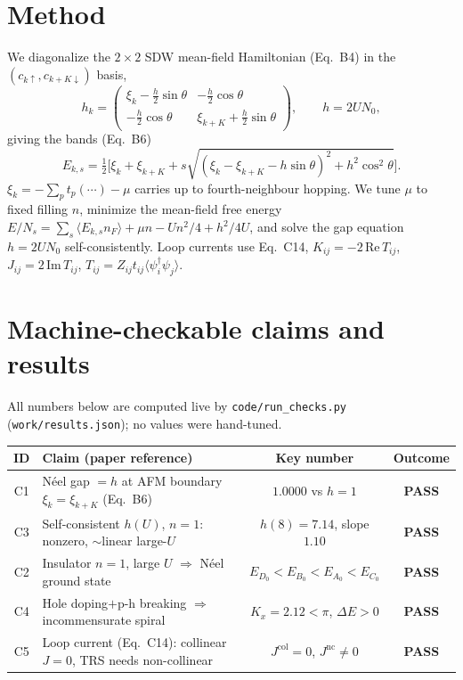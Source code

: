 \documentclass[11pt]{article}
\begin{document}
\section{Method}
We diagonalize the $2\times2$ SDW mean-field Hamiltonian (Eq.~B4) in the
$(c_{k\uparrow},c_{k+K\downarrow})$ basis,
\[
h_k=\begin{pmatrix}\xi_k-\tfrac{h}{2}\sin\theta & -\tfrac{h}{2}\cos\theta\\[2pt]
-\tfrac{h}{2}\cos\theta & \xi_{k+K}+\tfrac{h}{2}\sin\theta\end{pmatrix},
\qquad h=2UN_0,
\]
giving the bands (Eq.~B6)
\[
E_{k,s}=\tfrac12\Big[\xi_k+\xi_{k+K}+s\sqrt{(\xi_k-\xi_{k+K}-h\sin\theta)^2
+h^2\cos^2\theta}\Big].
\]
$\xi_k=-\sum_p t_p(\cdots)-\mu$ carries up to fourth-neighbour hopping. We tune
$\mu$ to fixed filling $n$, minimize the mean-field free energy
$E/N_s=\sum_s\langle E_{k,s}n_F\rangle+\mu n-Un^2/4+h^2/4U$, and solve the gap
equation $h=2UN_0$ self-consistently. Loop currents use Eq.~C14,
$K_{ij}=-2\,\mathrm{Re}\,T_{ij}$, $J_{ij}=2\,\mathrm{Im}\,T_{ij}$,
$T_{ij}=Z_{ij}t_{ij}\langle\psi_i^\dagger\psi_j\rangle$.

\section{Machine-checkable claims and results}
All numbers below are computed live by \texttt{code/run\_checks.py}
(\texttt{work/results.json}); no values were hand-tuned.

\begin{center}\small
\begin{tabular}{clcc}
\toprule
ID & Claim (paper reference) & Key number & Outcome\\
\midrule
C1 & N\'eel gap $=h$ at AFM boundary $\xi_k{=}\xi_{k+K}$ (Eq.~B6) & $1.0000$ vs $h{=}1$ & \textbf{PASS}\\
C3 & Self-consistent $h(U)$, $n{=}1$: nonzero, $\sim$linear large-$U$ & $h(8){=}7.14$, slope $1.10$ & \textbf{PASS}\\
C2 & Insulator $n{=}1$, large $U$ $\Rightarrow$ N\'eel ground state & $E_{D_0}{<}E_{B_0}{<}E_{A_0}{<}E_{C_0}$ & \textbf{PASS}\\
C4 & Hole doping$+$p-h breaking $\Rightarrow$ incommensurate spiral & $K_x{=}2.12{<}\pi$, $\Delta E{>}0$ & \textbf{PASS}\\
C5 & Loop current (Eq.~C14): collinear $J{=}0$, TRS needs non-collinear & $J^{\text{col}}{=}0$, $J^{\text{nc}}{\neq}0$ & \textbf{PASS}\\
\bottomrule
\end{tabular}
\end{center}
\end{document}
